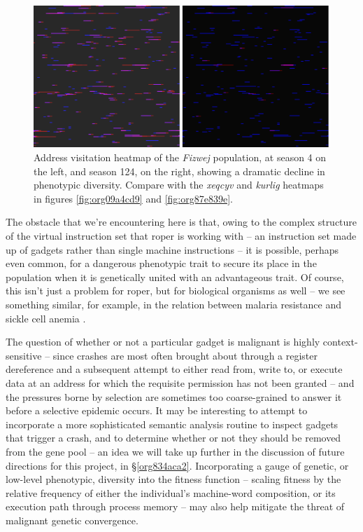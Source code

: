 \documentclass[12pt,glossary]{dalthesis}
\begin{document}
\begin{figure}[htbp]
\centering
\includegraphics[width=.9\linewidth]{../images/plots/fizwej_S124_heatmap.pdf}
\caption{\label{fig:orgea02433}
Address visitation heatmap of the \emph{Fizwej} population, at season 4 on the left, and season 124, on the right, showing a dramatic decline in phenotypic diversity. Compare with the \emph{xeqcyv} and \emph{kurlig} heatmaps in figures \ref{fig:org09a4cd9} and \ref{fig:org87e839e}.}
\end{figure}

The obstacle that we're encountering here is that, owing to the complex structure
of the virtual instruction set that \gls{roper} is working with -- an instruction set
made up of gadgets rather than single machine instructions -- it is possible, perhaps
even common, for a dangerous phenotypic trait to secure its place in the population
when it is genetically united with an advantageous trait. Of course, this isn't just
a problem for \gls{roper}, but for biological organisms as well -- we see something
similar, for example, in the relation between malaria resistance and sickle cell
anemia \cite{haldane49}.

The question of whether or not a particular gadget is malignant is highly
context-sensitive -- since crashes are most often brought about through a
register dereference and a subsequent attempt to either read from, write to, or
execute data at an address for which the requisite permission has not been
granted -- and the pressures borne by selection are sometimes too coarse-grained
to answer it before a selective epidemic occurs. It may be interesting to
attempt to incorporate a more sophisticated semantic analysis routine to inspect
gadgets that trigger a crash, and to determine whether or not they should be
removed from the gene pool -- an idea we will take up further in the discussion
of future directions for this project, in \S \ref{org834aca2}. Incorporating
a gauge of genetic, or low-level phenotypic, diversity into the fitness function
-- scaling fitness by the relative frequency of either the individual's
machine-word composition, or its execution path through process memory -- may
also help mitigate the threat of malignant genetic convergence.
\end{document}
